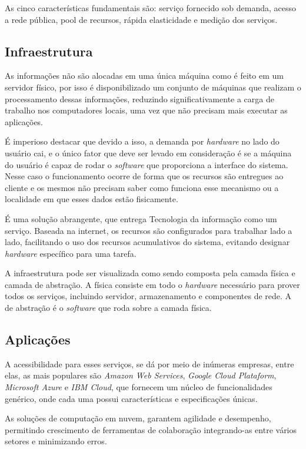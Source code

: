 \documentclass[12pt]{article}
\begin{document}
As cinco características fundamentais são: serviço fornecido sob demanda, acesso a rede pública, pool de recursos, rápida elasticidade e medição dos serviços.
\subsection{Infraestrutura}

As informações não são alocadas em uma única máquina como é feito em um servidor físico, por isso é disponibilizado um conjunto de máquinas que realizam o processamento dessas informações, reduzindo significativamente a carga de trabalho nos computadores locais, uma vez que não precisam mais executar as aplicações.

É imperioso destacar que devido a isso, a demanda por \emph{hardware} no lado do usuário cai, e o único fator que deve ser levado em consideração é se a máquina do usuário é capaz de rodar o \emph{software} que proporciona a interface do sistema. Nesse caso o funcionamento ocorre de forma que os recursos são entregues ao cliente e os mesmos não precisam saber como funciona esse mecanismo ou a localidade em que esses dados estão fisicamente.

É uma solução abrangente, que entrega Tecnologia da informação como um serviço. Baseada na internet, os recursos são configurados para trabalhar lado a lado, facilitando o uso dos recursos acumulativos do sistema, evitando designar \emph{hardware} específico para uma tarefa.

A infraestrutura pode ser visualizada como sendo composta pela camada física e camada de abstração. A física consiste em todo o \emph{hardware} necessário para prover todos os serviços, incluindo servidor, armazenamento e componentes de rede. A de abstração é o \emph{software} que roda sobre a camada física.

\subsection{Aplicações}

A acessibilidade para esses serviços, se dá por meio de inúmeras empresas, entre elas, as mais populares são \emph{Amazon Web Services}, \emph{Google Cloud Plataform}, \emph{Microsoft Azure} e \emph{IBM Cloud}, que fornecem um núcleo de funcionalidades genérico, onde cada uma possui características e especificações únicas.

As soluções de computação em nuvem, garantem agilidade e desempenho, permitindo crescimento de ferramentas de colaboração integrando-as entre vários setores e minimizando erros.
\end{document}

